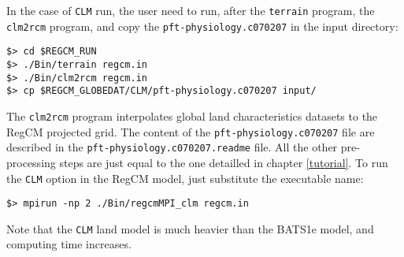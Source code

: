 In the case of \verb=CLM= run, the user need to run, after the \verb=terrain=
program, the \verb=clm2rcm= program, and copy the \verb=pft-physiology.c070207=
in the input directory:

\begin{Verbatim}
$> cd $REGCM_RUN
$> ./Bin/terrain regcm.in
$> ./Bin/clm2rcm regcm.in
$> cp $REGCM_GLOBEDAT/CLM/pft-physiology.c070207 input/
\end{Verbatim}

The \verb=clm2rcm= program interpolates global land characteristics datasets
to the RegCM projected grid. The content of the \verb=pft-physiology.c070207=
file are described in the \verb=pft-physiology.c070207.readme= file.
All the other pre-processing steps are just equal to the one detailled in
chapter \ref{tutorial}. To run the \verb=CLM= option in the RegCM model, just
substitute the executable name:

\begin{Verbatim}
$> mpirun -np 2 ./Bin/regcmMPI_clm regcm.in
\end{Verbatim}

Note that the \verb=CLM= land model is much heavier than the BATS1e model, and
computing time increases.
